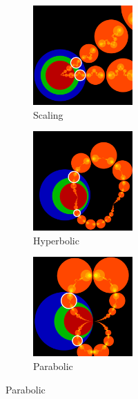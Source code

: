 \begin{figure}[h!tbp]
 \begin{minipage}[]{0.75\hsize}
  \begin{subfigure}{0.24\textwidth}
   \begin{center}
    \includegraphics[width=1.5in, height=1.5in, keepaspectratio]{../img/klein/2diis/scalingEdged.pdf}
    \caption{Scaling}
    \label{fig:scaling2d}
   \end{center}
  \end{subfigure}
 \hspace*{\fill}
 \begin{subfigure}{0.24\textwidth}
  \begin{center}
   \includegraphics[width=1.5in, height=1.5in, keepaspectratio]{../img/klein/2diis/hyperbolicEdged.pdf}
   \caption{Hyperbolic}
   \label{fig:hyperbolic2d}
  \end{center}
 \end{subfigure}
 \hspace*{\fill}
 \begin{subfigure}{0.24\textwidth}
  \begin{center}
   \includegraphics[width=1.5in, height=1.5in, keepaspectratio]{../img/klein/2diis/parabolicEdged.pdf}
   \caption{Parabolic}
   \label{fig:parabolic2d}
  \end{center}

\end{subfigure}
\end{minipage}
\end{figure}
